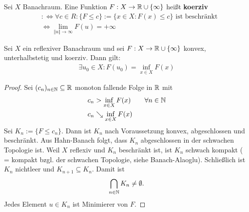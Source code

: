 \begin{erinnerung}
Sei $X$ Banachraum. Eine Funktion $F:X\to\mathbb{R}\cup\lbrace\infty\rbrace$ heißt \textbf{koerziv}
\begin{align*}
&:\Longleftrightarrow\forall c\in R:\big\lbrace F\leq c\big\rbrace:=\big\lbrace x\in X:F(x)\leq c\big\rbrace\text{ ist beschränkt}\\
&\Longleftrightarrow\lim\limits_{\Vert u\Vert\to\infty} F(u)=+\infty
\end{align*}
\end{erinnerung}

\begin{theorem}\label{theoremMinimieurngKonvexerFunktionen}\enter
Sei $X$ ein reflexiver Banachraum und sei $F:X\to\mathbb{R}\cup\lbrace\infty\rbrace$ konvex, unterhalbstetig und koerziv. Dann gilt:
\begin{align*}
\exists u_0\in X:F(u_0)=\inf\limits_{x\in X}F(x)
\end{align*}
\end{theorem}
\begin{proof}
Sei $(c_n)_{n\in\mathbb{N}}\subseteq\mathbb{R}$ monoton fallende Folge in $\mathbb{R}$ mit
\begin{align*}
c_n &> \inf\limits_{x\in X} F(x) \qquad \forall n\in\mathbb{N}\\
c_n &\searrow \inf\limits_{x\in X}F(x)
\end{align*}
Sei $K_n:=\big\lbrace F\leq c_n\big\rbrace$. Dann ist $K_n$ nach Voraussetzung konvex, abgeschlossen und beschränkt. Aus Hahn-Banach folgt, dass $K_n$ abgeschlossen in der schwachen Topologie ist. Weil $X$ reflexiv und $K_n$ beschränkt ist, ist $K_n$ schwach kompakt ( = kompakt bzgl. der schwachen Topologie, siehe Banach-Alaoglu). Schließlich ist $K_n$ nichtleer und $K_{n+1}\subseteq K_n$. Damit ist 
\begin{align*}
\bigcap\limits_{n\in\mathbb{N}}K_n\neq\emptyset.
\end{align*}
Jedes Element $u\in K_n$ ist Minimierer von $F$.
\end{proof}


